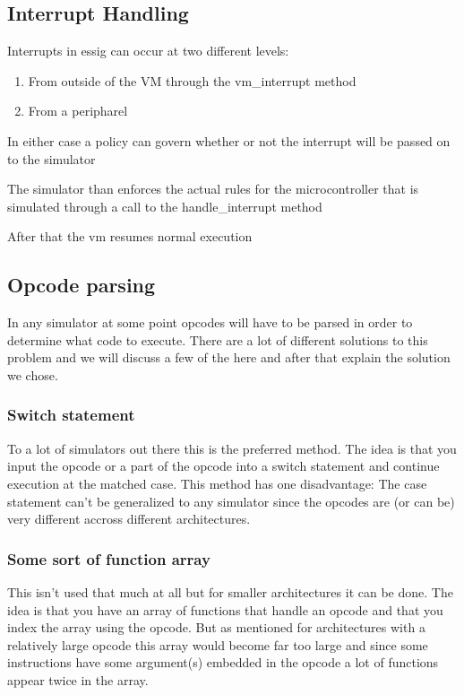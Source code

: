 \documentclass[a4paper]{article}
\newcommand\liststyleLi{%
\renewcommand\theenumi{\arabic{enumi}}
\renewcommand\theenumii{\arabic{enumii}}
\renewcommand\theenumiii{\arabic{enumiii}}
\renewcommand\theenumiv{\arabic{enumiv}}
\renewcommand\labelenumi{\theenumi.}
\renewcommand\labelenumii{\theenumii.}
\renewcommand\labelenumiii{\theenumiii.}
\renewcommand\labelenumiv{\theenumiv.}
}
\begin{document}
\subsection[Interrupt Handling]{Interrupt Handling}
{\sffamily
Interrupts in essig can occur at two different levels:}

\liststyleLi
\begin{enumerate}
\item {\sffamily
From outside of the VM through the vm\_interrupt method }
\item {\sffamily
From a peripharel }
\end{enumerate}
{\sffamily
In either case a policy can govern whether or not the interrupt will be
passed on to the simulator}

{\sffamily
The simulator than enforces the actual rules for the microcontroller
that is simulated through a call to the handle\_interrupt method}

{\sffamily
After that the vm resumes normal execution}
\subsection[Opcode parsing]{Opcode parsing}
{\sffamily
In any simulator at some point opcodes will have to be parsed in order
to determine what code to execute. There are a lot of different
solutions to this problem and we will discuss a few of the here and
after that explain the solution we chose.}

\subsubsection[Switch statement]{Switch statement}
{\sffamily
To a lot of simulators out there this is the preferred method. The idea
is that you input the opcode or a part of the opcode into a switch
statement and continue execution at the matched case. This method has
one disadvantage: The case statement can't be generalized to any
simulator since the opcodes are (or can be) very different accross
different architectures.}

\subsubsection{Some sort of function array}
{\sffamily
This isn't used that much at all but for smaller architectures it can be
done. The idea is that you have an array of functions that handle an
opcode and that you index the array using the opcode. But as mentioned
for architectures with a relatively large opcode this array would
become far too large and since some instructions have some argument(s)
embedded in the opcode a lot of functions appear twice in the array.}
\end{document}
